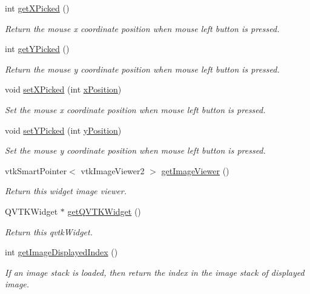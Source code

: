 \begin{DoxyCompactItemize}
\item 
int \hyperlink{class_q_v_t_k_image_widget_a4d7064fe8b60c16ce6e33122595850f2}{get\-X\-Picked} ()
\begin{DoxyCompactList}\small\item\em Return the mouse x coordinate position when mouse left button is pressed. \end{DoxyCompactList}\item 
int \hyperlink{class_q_v_t_k_image_widget_a9bb1f5c8af59046c632ce4401c14999b}{get\-Y\-Picked} ()
\begin{DoxyCompactList}\small\item\em Return the mouse y coordinate position when mouse left button is pressed. \end{DoxyCompactList}\item 
void \hyperlink{class_q_v_t_k_image_widget_a088f422bce686308654f8c0899c1780f}{set\-X\-Picked} (int \hyperlink{class_q_v_t_k_image_widget_afd88ea5dbed175232b0c15cbe4cdca89}{x\-Position})
\begin{DoxyCompactList}\small\item\em Set the mouse x coordinate position when mouse left button is pressed. \end{DoxyCompactList}\item 
void \hyperlink{class_q_v_t_k_image_widget_a33c482cc6629c52762f27649e39f6006}{set\-Y\-Picked} (int \hyperlink{class_q_v_t_k_image_widget_a6724caff3a614db8321deaa70532255c}{y\-Position})
\begin{DoxyCompactList}\small\item\em Set the mouse y coordinate position when mouse left button is pressed. \end{DoxyCompactList}\item 
vtk\-Smart\-Pointer$<$ vtk\-Image\-Viewer2 $>$ \hyperlink{class_q_v_t_k_image_widget_aaa03d39486c547c29d54127cf936c884}{get\-Image\-Viewer} ()
\begin{DoxyCompactList}\small\item\em Return this widget image viewer. \end{DoxyCompactList}\item 
Q\-V\-T\-K\-Widget $\ast$ \hyperlink{class_q_v_t_k_image_widget_a41d916b555961f04dbdb571d8263c515}{get\-Q\-V\-T\-K\-Widget} ()
\begin{DoxyCompactList}\small\item\em Return this qvtk\-Widget. \end{DoxyCompactList}\item 
int \hyperlink{class_q_v_t_k_image_widget_ae41186ba6e99598e4ad4380f7d7ef638}{get\-Image\-Displayed\-Index} ()
\begin{DoxyCompactList}\small\item\em If an image stack is loaded, then return the index in the image stack of displayed image. \end{DoxyCompactList}\end{DoxyCompactItemize}
